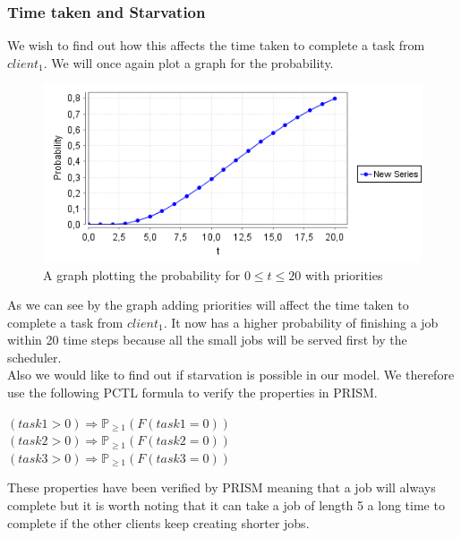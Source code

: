 \documentclass[12pt]{report}
\begin{document}
\subsubsection*{Time taken and Starvation}
We wish to find out how this affects the time taken to complete a task from $client_1$. We will once again plot a graph for the probability.
\begin{figure}[H]
	\centering
	\includegraphics[scale=0.75]{../GFX/B1-2b.png}
	\caption{A graph plotting the probability for $0 \leq t \leq 20$ with priorities}
\end{figure}
As we can see by the graph adding priorities will affect the time taken to complete a task from $client_1$. It now has a higher probability of finishing a job within 20 time steps because all the small jobs will be served first by the scheduler.
\\Also we would like to find out if starvation is possible in our model. We therefore use the following PCTL formula to verify the properties in PRISM.
\begin{center}
$(task1 > 0) \Rightarrow \mathbb{P}_{\geq 1}(F(task1 = 0))$\\
$(task2 > 0) \Rightarrow \mathbb{P}_{\geq 1}(F(task2 = 0))$\\
$(task3 > 0) \Rightarrow \mathbb{P}_{\geq 1} (F(task3 = 0))$
\end{center}
These properties have been verified by PRISM meaning that a job will always complete but it is worth noting that it can take a job of length 5 a long time to complete if the other clients keep creating shorter jobs.
\end{document}
